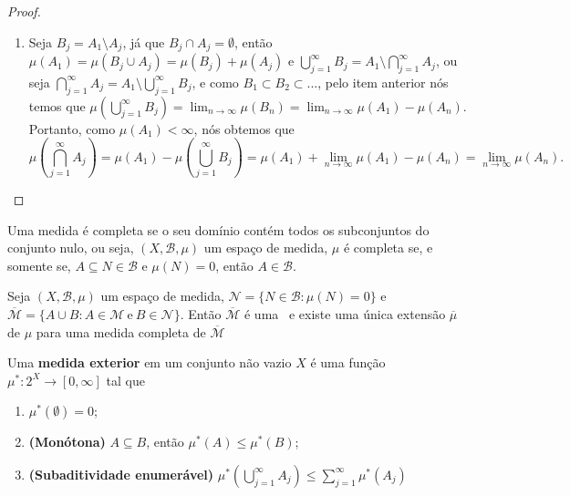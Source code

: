 \begin{teorema}
\begin{proof}
\begin{enumerate}[label=(\roman*)]
            \item Seja $B_j = A_1 \setminus A_j$, já que $B_j \cap A_j = \emptyset$, então $\mu(A_1)=\mu(B_j \cup A_j)= \mu(B_j) + \mu(A_j)$ e $\bigcup  _{j=1} ^\infty B_j = A_1 \setminus \bigcap _{j=1} ^\infty A_j $, ou seja $\bigcap _{j=1} ^\infty A_j = A_1 \setminus  \bigcup  _{j=1} ^\infty B_j$, e como $B_1 \subset B_2 \subset ...$, pelo item anterior nós temos que $\mu(\bigcup  _{j=1} ^\infty B_j)= \lim _{n \longrightarrow \infty} \mu(B_n) = \lim _{n \longrightarrow \infty} \mu (A_1) - \mu(A_n)$. Portanto, como $\mu(A_1) < \infty$, nós obtemos que
            \[
                \mu(\bigcap _{j=1} ^\infty A_j) = \mu(A_1) - \mu(\bigcup  _{j=1} ^\infty B_j) = \mu(A_1) + \lim _{n \longrightarrow \infty} \mu (A_1) - \mu(A_n) =   \lim _{n \longrightarrow \infty} \mu(A_n).
            \]
            
            
             
        \end{enumerate}
    \end{proof}

\end{teorema}

\begin{definicao}
    Uma medida é completa se o seu domínio contém todos os subconjuntos do conjunto nulo, ou seja, $(X,\mathcal{B},\mu)$ um espaço de medida, $\mu$ é completa se, e somente se, $A \subseteq N \in \mathcal{B}$ e $\mu(N)=0$, então $A \in \mathcal{B}$. 
\end{definicao}

\begin{teorema}
    Seja $(X,\mathcal{B},\mu)$ um espaço de medida, $\mathcal{N}=\{ N \in \mathcal{B} : \mu(N)=0 \}$ e $ \overline{\mathcal{M}} = \{ A \cup B : A \in \mathcal{M} \ \text{e} \ B \in \mathcal{N} \}$. Então $\overline{\mathcal{M}}$ é uma \sig \ e existe uma única extensão $\overline{\mu}$ de $\mu$ para uma medida completa de $\overline{\mathcal{M} }$ 
\end{teorema}

\begin{definicao}
    Uma \textbf{medida exterior} em um conjunto não vazio $X$ é uma função $\mu^*: 2^X \longrightarrow [0,\infty]$ tal que 
\end{definicao}

\begin{enumerate}[label=(\roman*)]
    \item $\mu^*(\emptyset)=0$;
    \item \textbf{(Monótona)}  $A \subseteq B$, então $\mu^* (A) \leq \mu^*(B)$;
    \item \textbf{(Subaditividade enumerável)} $\mu^* (\bigcup _{j=1} ^\infty A_j) \leq \sum _{j=1} ^\infty \mu^* (A_j) $
\end{enumerate}

